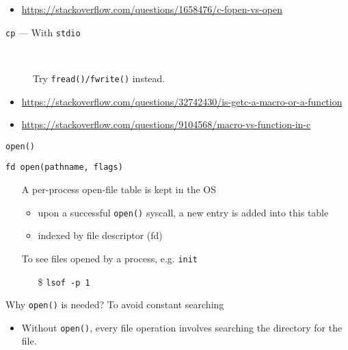 \begin{itemize}
\item \url{https://stackoverflow.com/questions/1658476/c-fopen-vs-open}
\end{itemize}

\begin{frame}{\texttt{cp} --- {\small With} \texttt{stdio}}
  \begin{center}
  \end{center}
  \begin{description}
  \item[] Try \texttt{fread()/fwrite()} instead.
  \end{description}
\end{frame}

\begin{itemize}
\item \url{https://stackoverflow.com/questions/32742430/is-getc-a-macro-or-a-function}
\item \url{https://stackoverflow.com/questions/9104568/macro-vs-function-in-c}
\end{itemize}



\begin{frame}{\texttt{open()}}
  \begin{block}{\texttt{fd open(pathname, flags)}}
    \begin{itemize}
    \item[] A per-process \alert{open-file table} is kept in the OS
      \begin{itemize}
      \item upon a successful \texttt{open()} syscall, a new entry is added into this table
      \item indexed by \alert{file descriptor (fd)}
      \end{itemize}
    \item[] To see files opened by a process, e.g. \texttt{init}
      \begin{itemize}
      \item[\$] \texttt{lsof -p 1}
      \end{itemize}
    \end{itemize}
  \end{block}
  \begin{block}{Why \texttt{open()} is needed?}
    To avoid constant searching
    \begin{itemize}
    \item Without \texttt{open()}, every file operation involves searching the directory for
      the file.
    \end{itemize}
  \end{block}
\end{frame}

